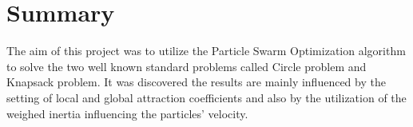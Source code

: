 \section{Summary}
The aim of this project was to utilize the Particle Swarm Optimization algorithm to solve the two well known standard problems called Circle problem and Knapsack problem. It was discovered the results are mainly influenced by the setting of local and global attraction coefficients and also by the utilization of the weighed inertia influencing the particles' velocity.